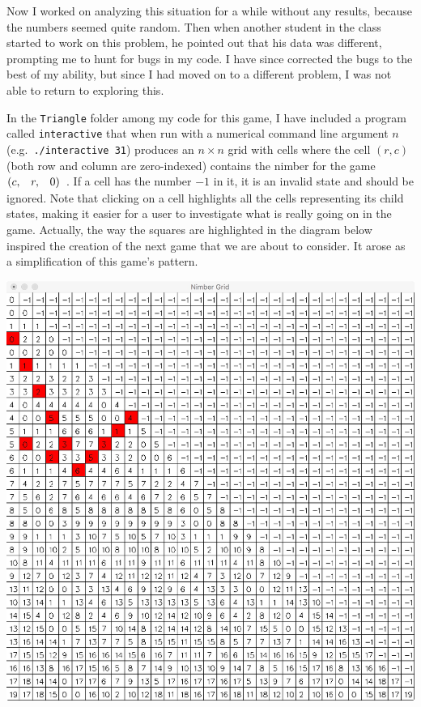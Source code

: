 \documentclass{article}
\makeatletter
\newcommand{\game}[3]{\begin{array}{@{}*6r}(#1, & #2, & #3)\end{array}}
\makeatother
\begin{document}
Now I worked on analyzing this situation for a while without any results,
because the numbers seemed quite random. Then when another student in the
class started to work on this problem, he pointed out that his data
was different, prompting me to hunt for bugs in my code. I have since
corrected the bugs to the best of my ability, but since I had moved on
to a different problem, I was not able to return to exploring this.
\bigskip

In the \verb|Triangle| folder among my code for this game, I have
included a program called \verb|interactive| that when run with a
numerical command line argument $n$ (e.g.\ \verb|./interactive 31|)
produces an $n \times n$ grid with cells where the cell
$(r, c)$ (both row and column are zero-indexed) contains the nimber
for the game $\game{c}{r}{0}$. If a cell has the number $-1$ in it,
it is an invalid state and should be ignored. Note that clicking on
a cell highlights all the cells representing its child states, making
it easier for a user to investigate what is really going on in the game.
Actually, the way the squares are highlighted in the diagram below
inspired the creation of the next game that we are about to 
consider. It arose as a simplification of this game's pattern.
\bigskip

\begin{center}
  \includegraphics[scale=0.2]{nimberGrid}
\end{center}
\newpage
\end{document}
